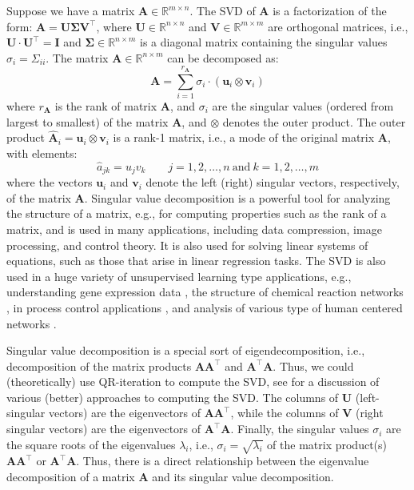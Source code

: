 \documentclass{article}[11pt]
\def\R{\mathbb{R}}
\begin{document}
Suppose we have a matrix $\mathbf{A} \in \R^{m \times n}$. The SVD of $\mathbf{A}$ is a factorization of the form: $\mathbf{A} = \mathbf{U}\mathbf{\Sigma}\mathbf{V}^{\top}$, where
$\mathbf{U}\in\mathbb{R}^{n\times{n}}$ and $\mathbf{V}\in\mathbb{R}^{m\times{m}}$ are orthogonal matrices, i.e., $\mathbf{U}\cdot\mathbf{U}^{\top} = \mathbf{I}$ and $\mathbf{\Sigma}\in\mathbb{R}^{n\times{m}}$ is a diagonal matrix containing 
the singular values $\sigma_{i}=\Sigma_{ii}$. The matrix $\mathbf{A}\in\mathbb{R}^{n\times{m}}$ can be decomposed as:
\begin{equation}
\mathbf{A} = \sum_{i=1}^{r_{\mathbf{A}}}\sigma_{i}\cdot\left(\mathbf{u}_{i}\otimes\mathbf{v}_{i}\right)
\end{equation}
where $r_{\mathbf{A}}$ is the rank of matrix $\mathbf{A}$, and $\sigma_{i}$ are the singular values (ordered from largest to smallest) of the matrix $\mathbf{A}$,
and $\otimes$ denotes the outer product. 
The outer product $\hat{\mathbf{A}}_{i} = \mathbf{u}_{i}\otimes\mathbf{v}_{i}$ is a rank-1 matrix, i.e., a mode of the original matrix $\mathbf{A}$,  with elements: 
\begin{equation}
\hat{a}_{jk} = u_{j}v_{k}\qquad{j=1,2,\dots,n~\text{and}~k=1,2,\dots,m}
\end{equation}
where the vectors $\mathbf{u}_{i}$ and $\mathbf{v}_{i}$ denote the left (right) singular vectors, respectively, of the matrix $\mathbf{A}$.
Singular value decomposition is a powerful tool for analyzing the structure of a matrix, e.g., for computing properties such as the rank of a matrix, and is used in many applications, 
including data compression, image processing, and control theory. It is also used for solving linear systems of equations,
such as those that arise in linear regression tasks. The SVD is also used in a huge variety of unsupervised learning type applications, e.g., understanding gene expression data \citep{Alter:2000aa, Alter:2006},  
the structure of chemical reaction networks \citep{Famili:2003aa}, 
in process control applications \citep{MooreSVD1986}, and analysis of various type of human centered networks \citep{SASTRY20075275, 7993780}.

Singular value decomposition is a special sort of eigendecomposition, i.e., decomposition of the matrix products $\mathbf{A}\mathbf{A}^{\top}$ and $\mathbf{A}^{\top}\mathbf{A}$.
Thus, we could (theoretically) use QR-iteration to compute the SVD, see \citep{Cline2006ComputationOT} for a discussion of various (better) approaches to computing the SVD.
The columns of $\mathbf{U}$ (left-singular vectors) are the eigenvectors of $\mathbf{A}\mathbf{A}^{\top}$, 
while the columns of $\mathbf{V}$ (right singular vectors) are the eigenvectors of $\mathbf{A}^{\top}\mathbf{A}$.
Finally, the singular values $\sigma_{i}$ are the square roots of the eigenvalues $\lambda_{i}$, i.e., $\sigma_{i} = \sqrt{\lambda_{i}}$ of the matrix product(s) $\mathbf{A}\mathbf{A}^{\top}$ or $\mathbf{A}^{\top}\mathbf{A}$. 
Thus, there is a direct relationship between the eigenvalue decomposition of a matrix $\mathbf{A}$ and its singular value decomposition.
\end{document}
